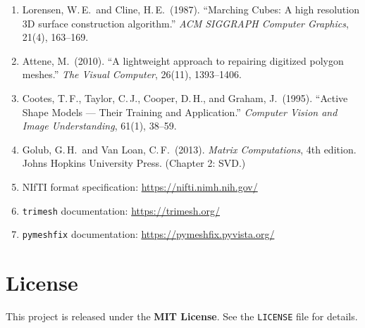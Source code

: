 \documentclass[12pt,a4paper]{article}
\begin{document}
\begin{enumerate}
    \item Lorensen, W.\,E.\ and Cline, H.\,E.\ (1987).
          ``Marching Cubes: A high resolution 3D surface construction algorithm.''
          \textit{ACM SIGGRAPH Computer Graphics}, 21(4), 163--169.

    \item Attene, M.\ (2010).
          ``A lightweight approach to repairing digitized polygon meshes.''
          \textit{The Visual Computer}, 26(11), 1393--1406.

    \item Cootes, T.\,F., Taylor, C.\,J., Cooper, D.\,H., and Graham, J.\ (1995).
          ``Active Shape Models — Their Training and Application.''
          \textit{Computer Vision and Image Understanding}, 61(1), 38--59.

    \item Golub, G.\,H.\ and Van Loan, C.\,F.\ (2013).
          \textit{Matrix Computations}, 4th edition.  Johns Hopkins University
          Press.  (Chapter 2: SVD.)

    \item NIfTI format specification:
          \url{https://nifti.nimh.nih.gov/}

    \item \texttt{trimesh} documentation:
          \url{https://trimesh.org/}

    \item \texttt{pymeshfix} documentation:
          \url{https://pymeshfix.pyvista.org/}
\end{enumerate}


\section*{License}

This project is released under the \textbf{MIT License}.
See the \texttt{LICENSE} file for details.
\end{document}
